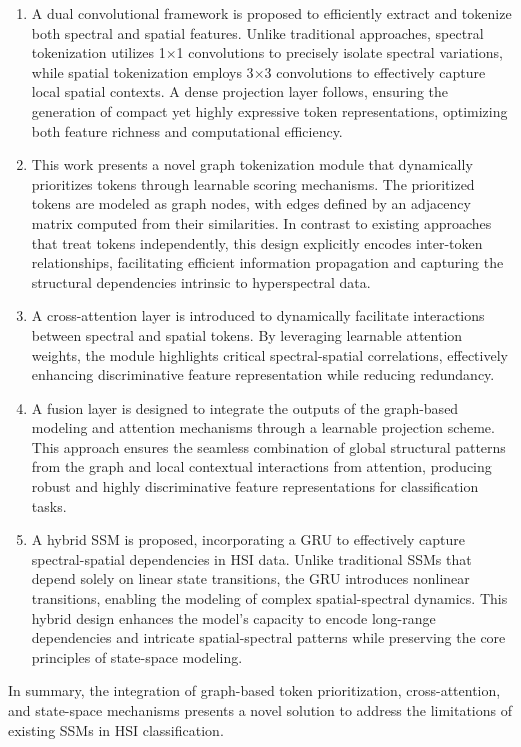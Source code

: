 \documentclass[journal]{IEEEtran}
\begin{document}
\begin{enumerate} 
    \item A dual convolutional framework is proposed to efficiently extract and tokenize both spectral and spatial features. Unlike traditional approaches, spectral tokenization utilizes 1$\times$1 convolutions to precisely isolate spectral variations, while spatial tokenization employs 3$\times$3 convolutions to effectively capture local spatial contexts. A dense projection layer follows, ensuring the generation of compact yet highly expressive token representations, optimizing both feature richness and computational efficiency.

    \item This work presents a novel graph tokenization module that dynamically prioritizes tokens through learnable scoring mechanisms. The prioritized tokens are modeled as graph nodes, with edges defined by an adjacency matrix computed from their similarities. In contrast to existing approaches that treat tokens independently, this design explicitly encodes inter-token relationships, facilitating efficient information propagation and capturing the structural dependencies intrinsic to hyperspectral data.

    \item A cross-attention layer is introduced to dynamically facilitate interactions between spectral and spatial tokens. By leveraging learnable attention weights, the module highlights critical spectral-spatial correlations, effectively enhancing discriminative feature representation while reducing redundancy.

    \item A fusion layer is designed to integrate the outputs of the graph-based modeling and attention mechanisms through a learnable projection scheme. This approach ensures the seamless combination of global structural patterns from the graph and local contextual interactions from attention, producing robust and highly discriminative feature representations for classification tasks.

    \item A hybrid SSM is proposed, incorporating a GRU to effectively capture spectral-spatial dependencies in HSI data. Unlike traditional SSMs that depend solely on linear state transitions, the GRU introduces nonlinear transitions, enabling the modeling of complex spatial-spectral dynamics. This hybrid design enhances the model's capacity to encode long-range dependencies and intricate spatial-spectral patterns while preserving the core principles of state-space modeling.
\end{enumerate}
In summary, the integration of graph-based token prioritization, cross-attention, and state-space mechanisms presents a novel solution to address the limitations of existing SSMs in HSI classification.
\end{document}
